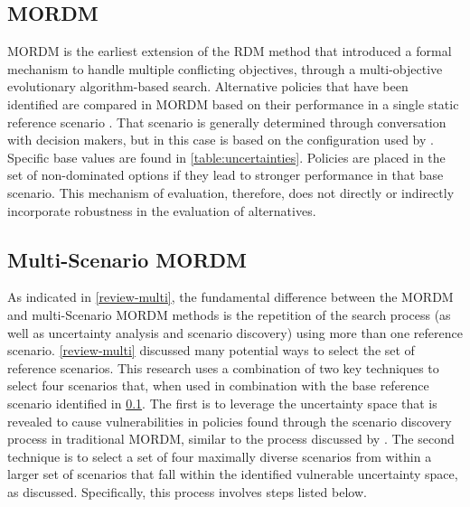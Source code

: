     \subsection{MORDM} \label{step2-mordm}
    MORDM is the earliest extension of the RDM method that introduced a formal mechanism to handle multiple conflicting objectives, through a multi-objective evolutionary algorithm-based search. Alternative policies that have been identified are compared in MORDM based on their performance in a single static reference scenario \citep{Kasprzyk2013}. That scenario is generally determined through conversation with decision makers, but in this case is based on the configuration used by \citep{Quinn2017}. Specific base values are found in \cref{table:uncertainties}. Policies are placed in the set of non-dominated options if they lead to stronger performance in that base scenario. This mechanism of evaluation, therefore, does not directly or indirectly incorporate robustness in the evaluation of alternatives. 

    \subsection{Multi-Scenario MORDM}
    As indicated in \cref{review-multi}, the fundamental difference between the MORDM and multi-Scenario MORDM methods is the repetition of the search process (as well as uncertainty analysis and scenario discovery) using more than one reference scenario. \cref{review-multi} discussed many potential ways to select the set of reference scenarios. This research uses a combination of two key techniques to select four scenarios that, when used in combination with the base reference scenario identified in \cref{step2-mordm}. The first is to leverage the uncertainty space that is revealed to cause vulnerabilities in policies found through the scenario discovery process in traditional MORDM, similar to the process discussed by \citet{Watson2017}. The second technique is to select a set of four maximally diverse scenarios from within a larger set of scenarios that fall within the identified vulnerable uncertainty space, as \citet{Eker2018} discussed. Specifically, this process involves steps listed below.
    
